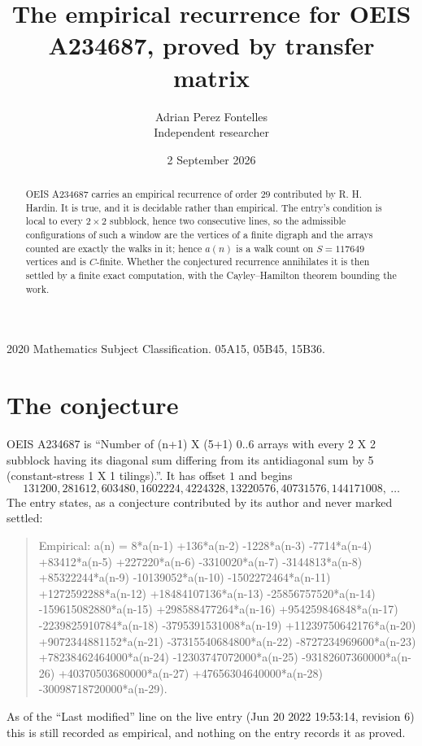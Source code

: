 \documentclass[11pt,a4paper]{article}
\title{The empirical recurrence for OEIS A234687, proved by transfer matrix}
\author{Adrian Perez Fontelles\\ \small Independent researcher}
\date{2 September 2026}
\theoremstyle{plain}
\theoremstyle{definition}
\begin{document}
\maketitle

\begin{abstract}
OEIS A234687 carries an empirical recurrence of order $29$ contributed by R. H. Hardin. It is
true, and it is decidable rather than empirical. The entry's condition is local to every $2\times2$ subblock, hence two consecutive lines, so
the admissible configurations of such a window are the vertices of a finite digraph and the
arrays counted are exactly the walks in it; hence $a(n)$ is a walk count on $S=117649$ vertices
and is $C$-finite. Whether the conjectured recurrence annihilates it is then settled by a
finite exact computation, with the Cayley--Hamilton theorem bounding the work.
\end{abstract}

\noindent\small 2020 Mathematics Subject Classification. 05A15, 05B45, 15B36.\normalsize

\section{The conjecture}

OEIS A234687 is ``Number of (n+1) X (5+1) 0..6 arrays with every 2 X 2 subblock having its diagonal sum differing from its antidiagonal sum by 5 (constant-stress 1 X 1 tilings).''. It has offset $1$ and begins
\[
131200, 281612, 603480, 1602224, 4224328, 13220576, 40731576, 144171008,\ \dots
\]
The entry states, as a conjecture contributed by its author and never marked settled:
\begin{quote}
Empirical: a(n) = 8*a(n-1) +136*a(n-2) -1228*a(n-3) -7714*a(n-4) +83412*a(n-5) +227220*a(n-6) -3310020*a(n-7) -3144813*a(n-8) +85322244*a(n-9) -10139052*a(n-10) -1502272464*a(n-11) +1272592288*a(n-12) +18484107136*a(n-13) -25856757520*a(n-14) -159615082880*a(n-15) +298588477264*a(n-16) +954259846848*a(n-17) -2239825910784*a(n-18) -3795391531008*a(n-19) +11239750642176*a(n-20) +9072344881152*a(n-21) -37315540684800*a(n-22) -8727234969600*a(n-23) +78238462464000*a(n-24) -12303747072000*a(n-25) -93182607360000*a(n-26) +40370503680000*a(n-27) +47656304640000*a(n-28) -30098718720000*a(n-29).
\end{quote}
As of the ``Last modified'' line on the live entry (Jun 20 2022 19:53:14, revision 6) this is still
recorded as empirical, and nothing on the entry records it as proved.
\end{document}
